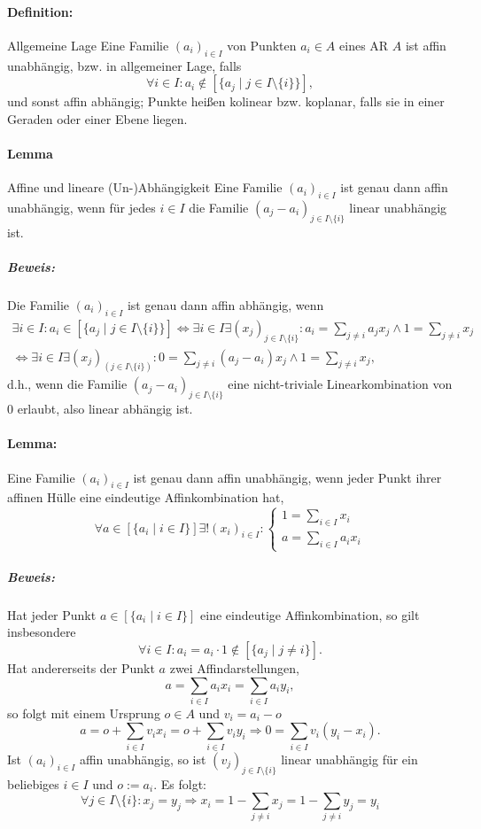 \paragraph{Definition: }
	\begin{Definition}{Allgemeine Lage}
		Eine Familie $ (a_i)_{i\in I} $ von Punkten $ a_i\in A $ eines AR $ A $ ist affin unabhängig, bzw. in allgemeiner Lage, falls
		\[ \forall i\in I:a_i\notin [\{a_j\mid j\in I\setminus \{i\}\}], \]
		und sonst affin abhängig; Punkte heißen kolinear bzw. koplanar, falls sie in einer Geraden oder einer Ebene liegen.
	\end{Definition}
\paragraph{Lemma}
	\begin{Lemma}{Affine und lineare (Un-)Abhängigkeit}
		Eine Familie $ (a_i)_{i\in I} $ ist genau dann affin unabhängig, wenn für jedes $ i\in I $ die Familie $ (a_j-a_i)_{j\in I\setminus \{i\}} $ linear unabhängig ist.
	\end{Lemma}
\subparagraph{Beweis: }
	Die Familie $ (a_i)_{i\in I} $ ist genau dann affin abhängig, wenn
	\begin{gather*}
		\exists i\in I:a_i\in [\{a_j\mid j\in I\setminus \{i\}\}] \Leftrightarrow \exists i\in I\exists(x_j)_{j\in I\setminus \{i\}}:a_i=\sum_{j\neq i}a_jx_j\land 1=\sum_{j\neq i}x_j\\
		\Leftrightarrow \exists i\in I\exists (x_j)_(j\in I\setminus \{i\}):0=\sum_{j\neq i}(a_j-a_i)x_j \land 1=\sum_{j\neq i}x_j,
	\end{gather*}
	d.h., wenn die Familie $ (a_j-a_i)_{j\in I\setminus \{i\}} $ eine nicht-triviale Linearkombination von 0 erlaubt, also linear abhängig ist.
\paragraph{Lemma: }
	\begin{Lemma}
		Eine Familie $ (a_i)_{i\in I} $ ist genau dann affin unabhängig, wenn jeder Punkt ihrer affinen Hülle eine eindeutige Affinkombination hat,
		\[ \forall a\in [\{a_i\mid i\in I\}]\exists!(x_i)_{i\in I}:
			\begin{cases}
			1 = \sum_{i\in I}x_i\\
			a = \sum_{i\in I}a_ix_i
			\end{cases}\]
	\end{Lemma}
	\subparagraph{Beweis: }
	Hat jeder Punkt $ a\in [\{a_i\mid i\in I\}] $ eine eindeutige Affinkombination, so gilt insbesondere
		\[ \forall i\in I: a_i = a_i\cdot 1 \notin [\{a_j\mid j\neq i\}]. \]
	Hat andererseits der Punkt $ a $ zwei Affindarstellungen,
		\[ a = \sum_{i\in I} a_ix_i = \sum_{i\in I}a_iy_i, \]
	so folgt mit einem Ursprung $ o\in A $ und $ v_i = a_i-o $
		\[ a=o+\sum_{i\in I}v_ix_i=o+\sum_{i\in I}v_iy_i \Rightarrow 0 = \sum_{i\in I}v_i(y_i-x_i). \]
	Ist $ (a_i)_{i\in I} $ affin unabhängig, so ist $ (v_j)_{j\in I\setminus \{i\}} $ linear unabhängig für ein beliebiges $ i\in I $ und $ o:= a_i $. Es folgt:
		\[ \forall j\in I\setminus \{i\}:x_j=y_j \Rightarrow x_i = 1-\sum_{j\neq i}x_j = 1-\sum_{j\neq i}y_j = y_i \]